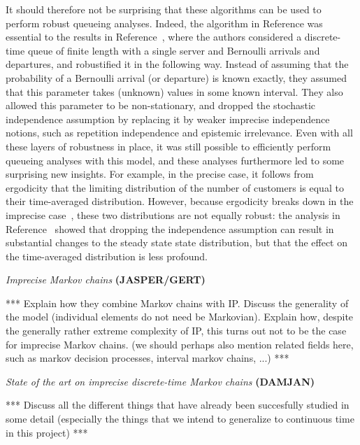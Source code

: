 \documentclass[11pt,dvipsnames,usenames,a4paper]{article}
\begin{document}
{It should therefore not be surprising that these algorithms can be used to perform robust queueing analyses. Indeed, the algorithm in Reference \cite{cooman2008} was essential to the results in Reference~\cite{2015Lopatatzidis}, where the authors considered a discrete-time queue of finite length with a single server and Bernoulli arrivals and departures, and robustified it in the following way.
Instead of assuming that the probability of a Bernoulli arrival (or departure) is known exactly, they assumed that this parameter takes (unknown) values in some known interval. They also allowed this parameter to be non-stationary, and dropped the stochastic independence assumption by replacing it by weaker imprecise independence notions, such as repetition independence and epistemic irrelevance.
Even with all these layers of robustness in place, it was still possible to efficiently perform queueing analyses with this model, and these analyses furthermore led to some surprising new insights. For example, in the precise case, it follows from ergodicity that the limiting distribution of the number of customers is equal to their time-averaged distribution. However, because ergodicity breaks down in the imprecise case~\cite{deCooman2015}, these two distributions are not equally robust: the analysis in Reference~\cite{2015Lopatatzidis} showed that dropping the independence assumption can result in substantial changes to the steady state state distribution, but that the effect on the time-averaged distribution is less profound.
}

\emph{Imprecise Markov chains} {\bf\color{blue} (JASPER/GERT)}

*** Explain how they combine Markov chains with IP. 
Discuss the generality of the model (individual elements do not need be Markovian).
Explain how, despite the generally rather extreme complexity of IP, this turns out not to be the case for imprecise Markov chains. (we should perhaps also mention related fields here, such as markov decision processes, interval markov chains, ...) ***

\emph{State of the art on imprecise discrete-time Markov chains} {\bf\color{blue} (DAMJAN)}

*** Discuss all the different things that have already been succesfully studied in some detail (especially the things that we intend to generalize to continuous time in this project) ***
\end{document}
